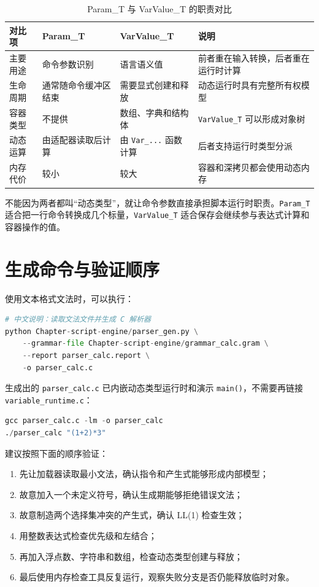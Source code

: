 \begin{table}[htbp]
\centering
\caption{Param\_T 与 VarValue\_T 的职责对比} \label{tab:app-param-var-compare}
\begin{tabularx}{\textwidth}{lllX}
\toprule
对比项 & Param\_T & VarValue\_T & 说明 \\
\midrule
主要用途 & 命令参数识别 & 语言语义值 & 前者重在输入转换，后者重在运行时计算 \\
生命周期 & 通常随命令缓冲区结束 & 需要显式创建和释放 & 动态运行时具有完整所有权模型 \\
容器类型 & 不提供 & 数组、字典和结构体 & \texttt{VarValue\_T} 可以形成对象树 \\
动态运算 & 由适配器读取后计算 & 由 \texttt{Var\_...} 函数计算 & 后者支持运行时类型分派 \\
内存代价 & 较小 & 较大 & 容器和深拷贝都会使用动态内存 \\
\bottomrule
\end{tabularx}
\end{table}

不能因为两者都叫“动态类型”，就让命令参数直接承担脚本运行时职责。\texttt{Param\_T} 适合把一行命令转换成几个标量，\texttt{VarValue\_T} 适合保存会继续参与表达式计算和容器操作的值。

\section{生成命令与验证顺序}

使用文本格式文法时，可以执行：

\begin{lstlisting}[language=Python]
# 中文说明：读取文法文件并生成 C 解析器
python Chapter-script-engine/parser_gen.py \
    --grammar-file Chapter-script-engine/grammar_calc.gram \
    --report parser_calc.report \
    -o parser_calc.c
\end{lstlisting}

生成出的 \texttt{parser\_calc.c} 已内嵌动态类型运行时和演示 \texttt{main()}，不需要再链接 \texttt{variable\_runtime.c}：

\begin{lstlisting}[language=Python]
gcc parser_calc.c -lm -o parser_calc
./parser_calc "(1+2)*3"
\end{lstlisting}

建议按照下面的顺序验证：

\begin{enumerate}
\item 先让加载器读取最小文法，确认指令和产生式能够形成内部模型；
\item 故意加入一个未定义符号，确认生成期能够拒绝错误文法；
\item 故意制造两个选择集冲突的产生式，确认 LL(1) 检查生效；
\item 用整数表达式检查优先级和左结合；
\item 再加入浮点数、字符串和数组，检查动态类型创建与释放；
\item 最后使用内存检查工具反复运行，观察失败分支是否仍能释放临时对象。
\end{enumerate}

